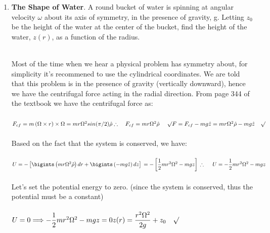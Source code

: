 \documentclass[fleqn]{article}
\begin{document}
  \begin{enumerate}
    \item \textbf{The Shape of Water}. A round bucket of water is spinning at angular velocity $\omega$ about its axis of symmetry, 
    in the presence of gravity, g. Letting $z_0$ be the height of the water at the center of the bucket, find the height of the water, $z(r)$, as a function of the radius.

      \textcolor{hwColor}{
        \\
        Most of the time when we hear a physical problem has symmetry about, for simplicity it's recommened 
        to use the cylindrical coordinates. We are told that this problem is in the presence of gravity (vertically downward),
        hence we have the centrifugal force acting in the radial direction. From page 344 of the textbook we have the centrifugal force as:
        \\
        \\
        $
          F_{cf}=m \left(\Omega \times r\right) \times \Omega
          \\
          \\
          =mr\Omega^2 sin(\pi/2) \hat{\rho}
          \\
          \\
          \therefore ~~~ F_{cf}=mr \Omega^2 \hat{\rho} ~~~~ \surd
          \\
          \\
          F=F_{cf}-mg \hat{z}=mr \Omega^2 \hat{\rho}-mg \hat{z} ~~~ \surd
        $
        \\
        \\
        Based on the fact that the system is conserved, we have: 
        \\
        \\
        $
          U=-\left[\bigints \left(mr \Omega^2 \hat{\rho}\right) dr+ \bigints \left(-mg \hat{z}\right) dz\right]
          \\
          \\
          =-\left[\dfrac{1}{2}mr^2 \Omega^2-mgz\right]
          \\
          \\
          \\
          \therefore ~~~~ U=-\dfrac{1}{2}mr^2 \Omega^2-mgz
        $
        \\
        \\
        Let's set the potential energy to zero. (since the system is conserved, thus the potential must be a constant) 
        \\
        \\
        $
          U=0 \Longrightarrow -\dfrac{1}{2}mr^2 \Omega^2-mgz=0
          \\
          \\
          \\
          z(r)=\dfrac{r^2 \Omega^2}{2g}+z_0 ~~~ \surd
        $
      }


\end{enumerate}
\end{document}
